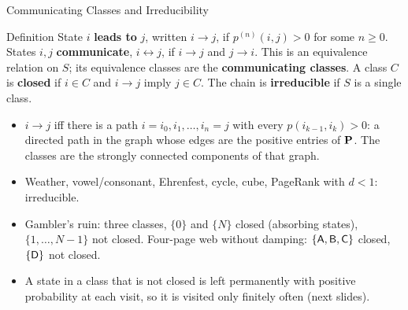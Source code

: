 \begin{frame}{Communicating Classes and Irreducibility}
  \label{fr:classes}
  \small
  \begin{block}{Definition}
    State $i$ \textbf{leads to} $j$, written $i\to j$, if $p^{(n)}(i,j)>0$ for some $n\ge0$. States $i,j$ \textbf{communicate}, $i\leftrightarrow j$, if $i\to j$ and $j\to i$. This is an equivalence relation on $S$; its equivalence classes are the \textbf{communicating classes}. A class $C$ is \textbf{closed} if $i\in C$ and $i\to j$ imply $j\in C$. The chain is \textbf{irreducible} if $S$ is a single class.
  \end{block}
  \begin{itemize}
    \item $i\to j$ iff there is a path $i=i_0,i_1,\dots,i_n=j$ with every $p(i_{k-1},i_k)>0$: a directed path in the graph whose edges are the positive entries of $\mathbf{P}$. The classes are the strongly connected components of that graph.
    \item Weather, vowel/consonant, Ehrenfest, cycle, cube, PageRank with $d<1$: irreducible.
    \item Gambler's ruin: three classes, $\{0\}$ and $\{N\}$ closed (absorbing states), $\{1,\dots,N-1\}$ not closed. Four-page web without damping: $\{\mathsf{A},\mathsf{B},\mathsf{C}\}$ closed, $\{\mathsf{D}\}$ not closed.
    \item A state in a class that is not closed is left permanently with positive probability at each visit, so it is visited only finitely often (next slides).
  \end{itemize}
\end{frame}

